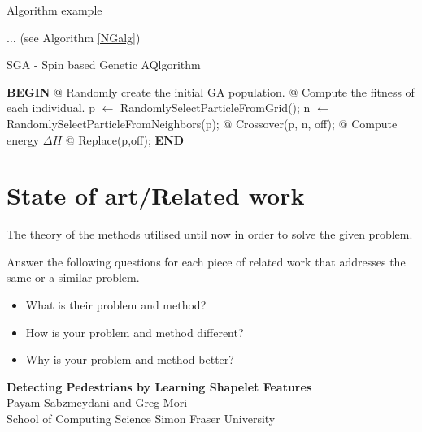 \documentclass[runningheads,a4paper,11pt]{report}
\begin{document}
Algorithm example 

$\ldots$ (see Algorithm \ref{NGalg})



\begin{algorithm}
	\caption{SGA - Spin based Genetic AQlgorithm}
	\label{NGalg}
		\begin{algorithmic}


			\STATE \textbf{BEGIN}
  		\STATE @ Randomly create the initial GA population.
  		\STATE @ Compute the fitness of each individual.
  				\STATE p $\leftarrow$ RandomlySelectParticleFromGrid();
  				\STATE n $\leftarrow$ RandomlySelectParticleFromNeighbors(p);
  				\STATE @ Crossover(p, n, off);
  				\STATE @ Compute energy $\Delta H$
  					\STATE @ Replace(p,off);
  				\ENDIF
  			\ENDFOR
  		\ENDFOR
  		\STATE \textbf{END}
\end{algorithmic}
\end{algorithm}


\chapter{State of art/Related work}
\label{chapter:stateOfArt}


The theory of the methods utilised until now in order to solve the given problem.

Answer the following questions for each piece of related work that addresses the same or a similar problem. 
\begin{itemize}
	\item What is their problem and method? 
	\item How is your problem and method different? 
	\item Why is your problem and method better?
\end{itemize} 



\textbf{Detecting Pedestrians by Learning Shapelet Features} \\
Payam Sabzmeydani and Greg Mori \\
School of Computing Science Simon Fraser University \\
\end{document}
